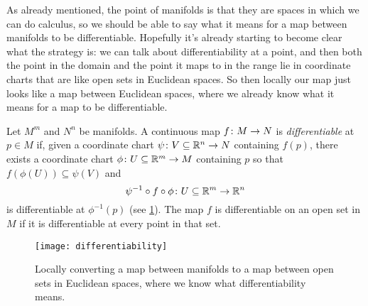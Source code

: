 As already mentioned, the point of manifolds is that they are spaces in which we can do calculus, so we should be able to say what it means for a map between manifolds to be differentiable. Hopefully it's already starting to become clear what the strategy is: we can talk about differentiability at a point, and then both the point in the domain and the point it maps to in the range lie in coordinate charts that are like open sets in Euclidean spaces. So then locally our map just looks like a map between Euclidean spaces, where we already know what it means for a map to be differentiable.

\begin{definition}\label{def:differentiable}
	Let $M^m$ and $N^n$ be manifolds. A continuous map $f\colon\thinspace\! M \to N$ is \emph{differentiable} at $p \in M$ if, given a coordinate chart $\psi\colon\thinspace\! V \subseteq \mathbb{R}^n \to N$ containing $f(p)$, there exists a coordinate chart $\phi\colon\thinspace\! U \subseteq \mathbb{R}^m \to M$ containing $p$ so that $f(\phi(U)) \subseteq \psi(V)$ and 
	\[
		\psi^{-1} \circ f \circ \phi\colon\thinspace\! U \subseteq \mathbb{R}^m \to \mathbb{R}^n
	\]
	is differentiable at $\phi^{-1}(p)$ (see \cref{fig:differentiable}). The map $f$ is differentiable on an open set in $M$ if it is differentiable at every point in that set.
\end{definition}

\begin{figure}[htbp]
	\centering
		\texttt{[image: differentiability]}
	\caption{Locally converting a map between manifolds to a map between open sets in Euclidean spaces, where we know what differentiability means.}
	\label{fig:differentiable}
\end{figure}

